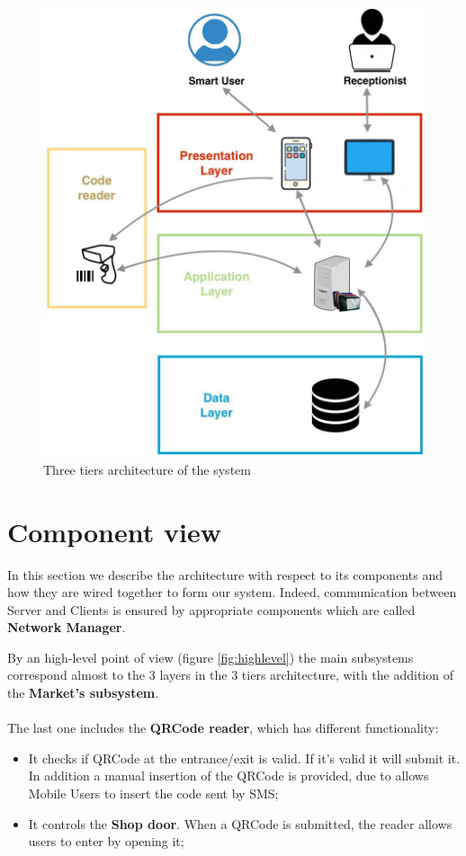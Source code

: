 \begin{figure}[H]
  \label{3tiers}
  \centering
  \includegraphics[scale=0.30]{diagrams/3_tiers.jpeg}
  \caption{Three tiers architecture of the system}
  \label{3-tier}

\end{figure}

\pagebreak
\section{Component view}



In this section we describe the architecture with respect to its components and how they are wired together to form our system. 
Indeed, communication between Server and Clients is ensured by appropriate components which are called \textbf{Network Manager}. \par 
By an high-level point of view (figure \ref{fig:highlevel}) the main subsystems correspond almost to the 3 layers in the 3 tiers architecture, with the addition of the \textbf{Market's subsystem}. \\ \\
The last one includes the \textbf{QRCode reader}, which has different functionality:
\begin{itemize}
\item It checks if QRCode at the entrance/exit is valid. If it's valid it will submit it. In addition a manual insertion of the QRCode is provided, due to allows Mobile Users to insert the code sent by SMS;
\item It controls the \textbf{Shop door}. When a QRCode is submitted, the reader allows users to enter by opening it;
\end{itemize}

